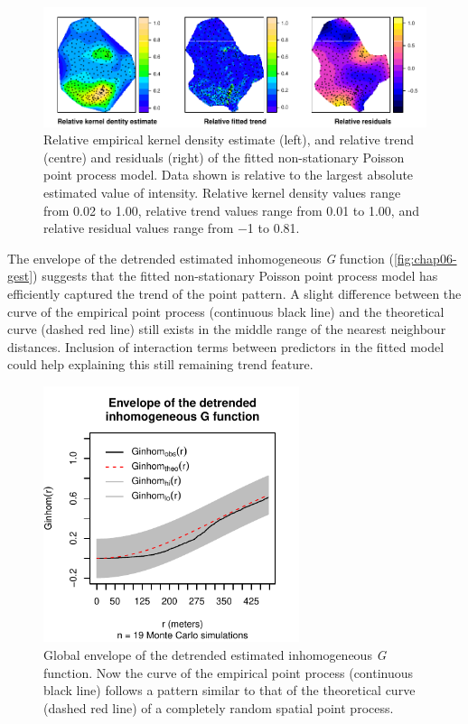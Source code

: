 \begin{figure}[!h]
 \centering
 \includegraphics[width=\textwidth]{fig/chap06-kernel-trend-res}
 \caption{Relative empirical kernel density estimate (left), and relative trend (centre) and residuals (right) 
 of the fitted non-stationary Poisson point process model. Data shown is relative to the largest absolute
 estimated value of intensity. Relative kernel density values range from \num{0.02} to \num{1.00}, relative
 trend values range from \num{0.01} to \num{1.00}, and relative residual values range from \num{-1} to
 \num{0.81}.}
 \label{fig:chap06-trend}
\end{figure}

The envelope of the detrended estimated inhomogeneous \emph{G} function (\autoref{fig:chap06-gest}) suggests 
that the fitted non-stationary Poisson point process model has efficiently captured the trend of the point 
pattern. A slight difference between the curve of the empirical point process (continuous black line) and the 
theoretical curve (dashed red line) still exists in the middle range of the nearest neighbour distances. 
Inclusion of interaction terms between predictors in the fitted model could help explaining this still 
remaining trend feature.

\begin{figure}[!h]
 \centering
 \includegraphics[trim=0mm 0mm 0mm 12mm,clip=true,width=7.5cm]{fig/chap06-fit-gest-sim}
 \caption{Global envelope of the detrended estimated inhomogeneous \emph{G} function. Now the curve of the 
 empirical point process (continuous black line) follows a pattern similar to that of the theoretical curve 
 (dashed red line) of a completely random spatial point process.}
 \label{fig:chap06-trend}
\end{figure}

